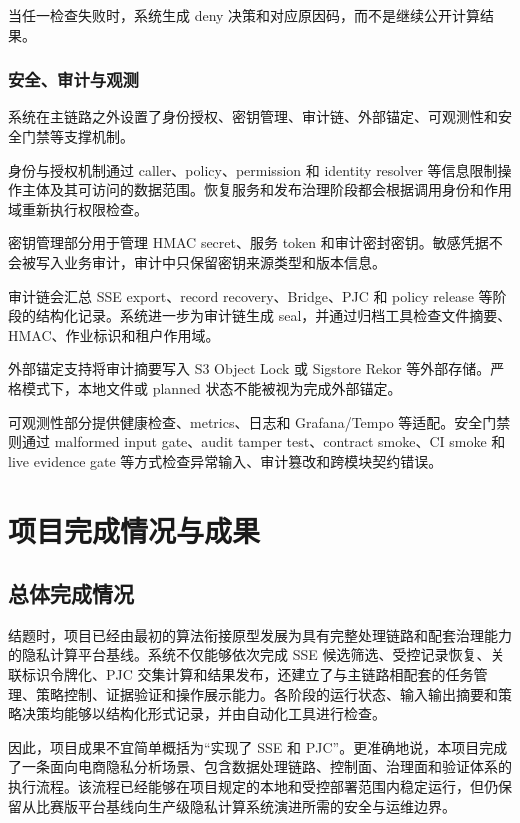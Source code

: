 \documentclass[UTF8,a4paper,12pt,oneside]{ctexrep}
\begin{document}
当任一检查失败时，系统生成 deny 决策和对应原因码，而不是继续公开计算结果。

\subsection{安全、审计与观测}

系统在主链路之外设置了身份授权、密钥管理、审计链、外部锚定、可观测性和安全门禁等支撑机制。

身份与授权机制通过 caller、policy、permission 和 identity resolver 等信息限制操作主体及其可访问的数据范围。恢复服务和发布治理阶段都会根据调用身份和作用域重新执行权限检查。

密钥管理部分用于管理 HMAC secret、服务 token 和审计密封密钥。敏感凭据不会被写入业务审计，审计中只保留密钥来源类型和版本信息。

审计链会汇总 SSE export、record recovery、Bridge、PJC 和 policy release 等阶段的结构化记录。系统进一步为审计链生成 seal，并通过归档工具检查文件摘要、HMAC、作业标识和租户作用域。

外部锚定支持将审计摘要写入 S3 Object Lock 或 Sigstore Rekor 等外部存储。严格模式下，本地文件或 planned 状态不能被视为完成外部锚定。

可观测性部分提供健康检查、metrics、日志和 Grafana/Tempo 等适配。安全门禁则通过 malformed input gate、audit tamper test、contract smoke、CI smoke 和 live evidence gate 等方式检查异常输入、审计篡改和跨模块契约错误。







\chapter{项目完成情况与成果}

\section{总体完成情况}

结题时，项目已经由最初的算法衔接原型发展为具有完整处理链路和配套治理能力的隐私计算平台基线。系统不仅能够依次完成 SSE 候选筛选、受控记录恢复、关联标识令牌化、PJC 交集计算和结果发布，还建立了与主链路相配套的任务管理、策略控制、证据验证和操作展示能力。各阶段的运行状态、输入输出摘要和策略决策均能够以结构化形式记录，并由自动化工具进行检查。

因此，项目成果不宜简单概括为“实现了 SSE 和 PJC”。更准确地说，本项目完成了一条面向电商隐私分析场景、包含数据处理链路、控制面、治理面和验证体系的执行流程。该流程已经能够在项目规定的本地和受控部署范围内稳定运行，但仍保留从比赛版平台基线向生产级隐私计算系统演进所需的安全与运维边界。
\end{document}
